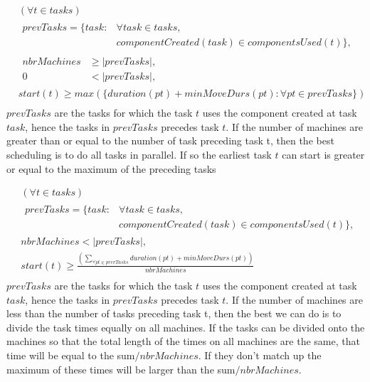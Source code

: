\documentclass[10pt,a4paper]{report}
\begin{document}
\begin{equation}
\begin{aligned}\label{eq:70}
&(\forall t \in tasks)\\
&\begin{aligned}
prevTasks = \{task : &\forall task \in tasks,\\
&componentCreated(task) \in componentsUsed(t)\},
\end{aligned}\\
&\begin{aligned}
nbrMachines &\ge |prevTasks|,\\
0 &< |prevTasks|,
\end{aligned}\\
&start(t) \ge max(\{duration(pt) + minMoveDurs(pt) : \forall pt \in prevTasks\}) \\
\end{aligned}
\end{equation}
$prevTasks$ are the tasks for which the task $t$ uses the component created at task $task$, hence the tasks in $prevTasks$ precedes task $t$. If the number of machines are greater than or equal to the number of task preceding task t, then the best scheduling is to do all tasks in parallel. If so the earliest task $t$ can start is greater or equal to the maximum of the preceding tasks

\begin{equation}
\begin{aligned}\label{eq:71}
&(\forall t \in tasks) \\
&\begin{aligned}
prevTasks = \{task : &\forall task \in tasks,\\
&componentCreated(task) \in componentsUsed(t)\},
\end{aligned} \\
&nbrMachines < |prevTasks|,  \\
&start(t) \ge \frac{\left(\sum_{\forall pt \in prevTasks}duration(pt) + minMoveDurs(pt)\right)}{nbrMachines} \\
\end{aligned}
\end{equation}
$prevTasks$ are the tasks for which the task $t$ uses the component created at task $task$, hence the tasks in $prevTasks$ precedes task $t$. If the number of machines are less than the number of tasks preceding task t, then the best we can do is to divide the task times equally on all machines. If the tasks can be divided onto the machines so that the total length of the times on all machines are the same, that time will be equal to the sum$/nbrMachines$. If they don't match up the maximum of these times will be larger than the sum$/nbrMachines$.
\end{document}
